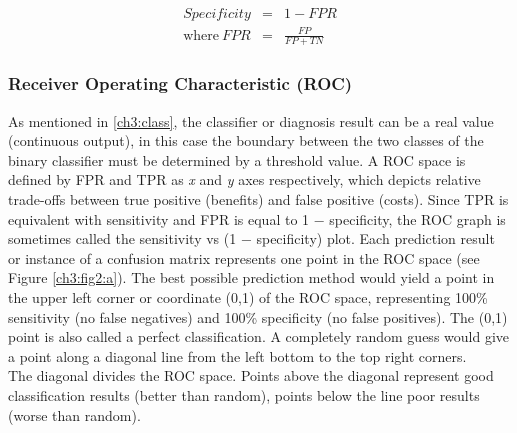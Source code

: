 \begin{eqnarray}
 Specificity & = & 1 - FPR\\
 \textrm{where} \ FPR & = & \frac{FP}{FP + TN}
\end{eqnarray}

\vspace{0.5cm}

\subsubsection{Receiver Operating Characteristic (ROC)}
\label{ch3:roc}

As mentioned in \ref{ch3:class}, the classifier or diagnosis result can be a real value (continuous output),
in this case the boundary between the two classes of the binary classifier must be determined by a threshold value.
A \Gls{ROC} space is defined by FPR and TPR as \textit{x} and \textit{y} axes respectively, which depicts relative trade-offs between true positive (benefits) and false positive (costs)\cite{ROC01}.
Since TPR is equivalent with sensitivity and FPR is equal to 1 − specificity, the ROC graph is sometimes called the sensitivity vs (1 − specificity) plot\cite{ROC_precision_recall}.
Each prediction result or instance of a confusion matrix represents one point in the ROC space (see Figure \ref{ch3:fig2:a}).
The best possible prediction method would yield a point in the upper left corner or coordinate (0,1) of the ROC space, representing 100\% sensitivity (no false negatives)
and 100\% specificity (no false positives). The (0,1) point is also called a perfect classification. A completely random guess would give a point along a diagonal line
from the left bottom to the top right corners.\\
The diagonal divides the \Gls{ROC} space. Points above the diagonal represent good classification results (better than random),
points below the line poor results (worse than random).

